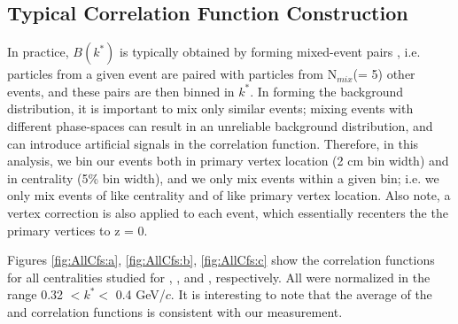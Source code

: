 \documentclass[/home/jesse/Analysis/FemtoAnalysis/AnalysisNotes/AnalysisNoteJBuxton.tex]{subfiles}
\begin{document}
\subsection{Typical Correlation Function Construction}
\label{TypicalCfConstruction}

In practice, $B(k^{*})$ is typically obtained by forming mixed-event pairs \cite{Kopylov:1974th}, i.e. particles from a given event are paired with particles from N$_{mix}$(= 5) other events, and these pairs are then binned in $k^{*}$.
In forming the background distribution, it is important to mix only similar events; mixing events with different phase-spaces can result in an unreliable background distribution, and can introduce artificial signals in the correlation function.
Therefore, in this analysis, we bin our events both in primary vertex location (2 cm bin width) and in centrality (5\% bin width), and we only mix events within a given bin; i.e. we only mix events of like centrality and of like primary vertex location.
Also note, a vertex correction is also applied to each event, which essentially recenters the the primary vertices to z = 0.

Figures \ref{fig:AllCfs:a}, \ref{fig:AllCfs:b}, \ref{fig:AllCfs:c} show the correlation functions for all centralities studied for \LamKchPALamKchM, \LamKchMALamKchP, and \LamALamKs, respectively. All were normalized in the range 0.32 $< k^{*} < $ 0.4 GeV/$c$.  It is interesting to note that the average of the \LamKchPALamKchM and \LamKchMALamKchP correlation functions is consistent with our \LamKsALamKs measurement. 
\end{document}

